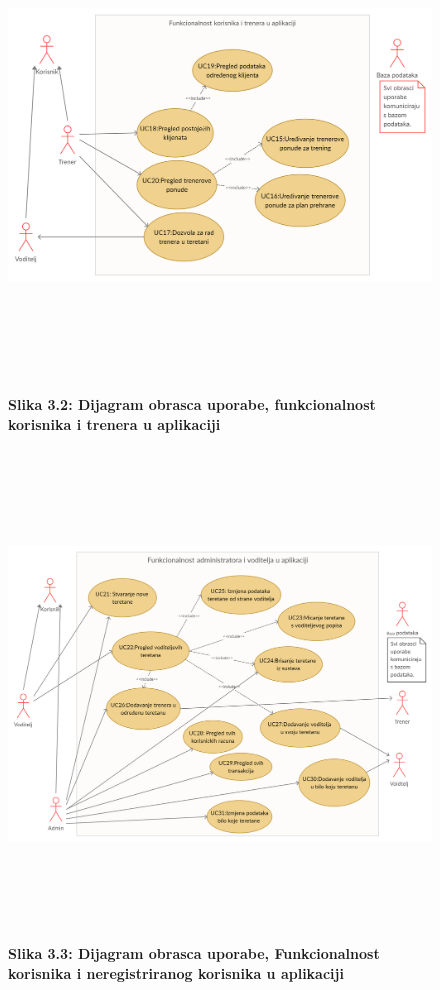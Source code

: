 				\begin{figure}
				\includegraphics[height= 13cm,width=1.2\textwidth]{dokumentacija/slike/obrazac2.jpg}
				\textbf{Slika 3.2: Dijagram obrasca uporabe, funkcionalnost korisnika i trenera u aplikaciji}
				\end{figure}
				
				\begin{figure}
				\includegraphics[height= 13cm,width=1.2\textwidth]{dokumentacija/slike/obrazac3.jpg}
				\textbf{Slika 3.3: Dijagram obrasca uporabe, Funkcionalnost korisnika i neregistriranog korisnika u aplikaciji}
				\end{figure}
				
